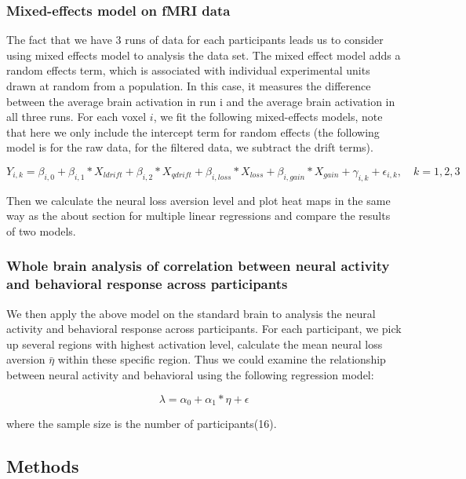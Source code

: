 \documentclass[11pt]{article}
\begin{document}
\subsubsection{Mixed-effects model on fMRI data}

The fact that we have 3 runs of data for each participants leads us to consider 
using mixed effects model to analysis the data set. The mixed effect model adds 
a random effects term, which is associated with individual experimental units 
drawn at random from a population. In this case, it measures the difference 
between the average brain activation in run i and the 
average brain activation in all three runs. For each voxel $i$, we fit the 
following mixed-effects models, note that here we only include the intercept 
term for random effects (the following model is for the raw data, for the 
filtered data, we subtract the drift terms).

\begin{equation}
Y_{i, k} = \beta_{i, 0} + \beta_{i,1} *X_{ldrift} + \beta_{i, 2} * X_{qdrift} 
+  \beta_{i, loss} *X_{loss} + \beta_{i, gain} * X_{gain}  + \gamma _{i, k} 
+ \epsilon_{i, k}, \quad k =1, 2, 3
\end{equation}

Then we calculate the neural loss aversion level and plot heat maps in the same 
way as the about section for multiple linear regressions and compare the 
results of two models. 

\subsubsection{Whole brain analysis of correlation between 
neural activity and behavioral response across participants}

We then apply the above model on the standard brain to analysis the neural 
activity and behavioral response across participants. For each participant, 
we pick up several regions with highest activation level, calculate the mean 
neural loss aversion $\bar{\eta}$ within these specific region. Thus we could 
examine the relationship between neural activity and behavioral using the 
following regression model:

\begin{equation}
\lambda = \alpha_0 + \alpha_1 * \eta + \epsilon
\end{equation}

where the sample size is the number of participants(16). 

\subsection{Methods}
\end{document}

